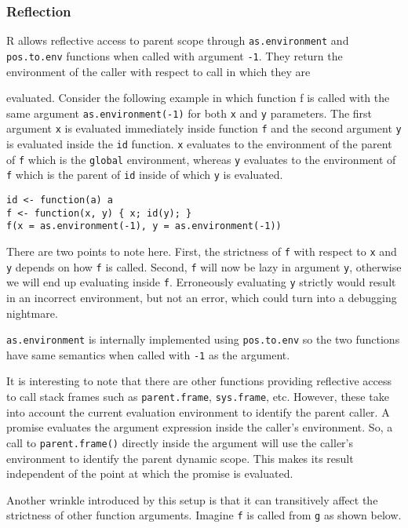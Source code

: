 \documentclass[review,nonacm,screen,acmsmall,anonymous=true]{acmart}
\newcommand{\code}[1]{\lstinline |#1|\xspace}
\begin{document}
\subsubsection{Reflection}

R allows reflective access to parent scope through \code{as.environment} and
\code{pos.to.env} functions when called with argument \code{-1}.
They return the environment of the caller with respect to call in which they are

evaluated. Consider the following example in which function f is called with the
same argument \code{as.environment(-1)} for both \code{x} and \code{y}
parameters. The first argument \code{x} is evaluated immediately inside
function \code{f} and the second argument \code{y} is evaluated inside the
\code{id} function. \code{x} evaluates to the environment of the parent of
\code{f} which is the \code{global} environment, whereas \code{y} evaluates to
the environment of \code{f} which is the parent of \code{id} inside of which
\code{y} is evaluated.

\begin{lstlisting}
id <- function(a) a
f <- function(x, y) { x; id(y); }
f(x = as.environment(-1), y = as.environment(-1))
\end{lstlisting}

There are two points to note here. First, the strictness of \code{f} with
respect to \code{x} and \code{y} depends on how \code{f} is called. Second,
\code{f} will now be lazy in argument \code{y}, otherwise we will end up
evaluating inside \code{f}. Erroneously evaluating \code{y} strictly would
result in an incorrect environment, but not an error, which could turn into a
debugging nightmare.

\code{as.environment} is internally implemented using \code{pos.to.env} so the
two functions have same semantics when called with \code{-1} as the argument.

It is interesting to note that there are other functions providing reflective
access to call stack frames such as \code{parent.frame}, \code{sys.frame}, etc.
However, these take into account the current evaluation environment to identify
the parent caller. A promise evaluates the argument expression inside the
caller's environment. So, a call to \code{parent.frame()} directly inside the
argument will use the caller's environment to identify the parent dynamic scope.
This makes its result independent of the point at which the promise is
evaluated.

Another wrinkle introduced by this setup is that it can transitively affect the
strictness of other function arguments. Imagine \code{f} is called from \code{g}
as shown below.
\end{document}
